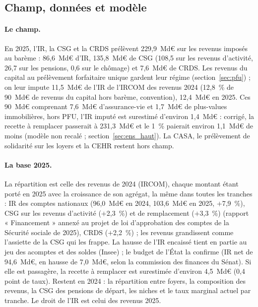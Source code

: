 
\subsection{Champ, données et modèle}

\paragraph{Le champ.} En 2025, l'IR, la CSG et la CRDS prélèvent 229,9~Md€ sur les revenus imposés au barème : 86,6~Md€
d'IR, 135,8~Md€ de CSG (108,5 sur les revenus d'activité, 26,7 sur les pensions, 0,6 sur le chômage) et 7,6~Md€ de CRDS.
Les revenus du capital au prélèvement forfaitaire unique gardent leur régime (section~\ref{sec:pfu}) ; on leur impute
11,5~Md€ de l'IR de l'IRCOM des revenus 2024 (12,8~\% de 90~Md€ de revenus du capital hors barème, convention), 12,4~Md€
en 2025. Ces 90~Md€ comprenant 7,6~Md€ d'assurance-vie et 1,7~Md€ de plus-values immobilières, hors PFU, l'IR imputé est
surestimé d'environ 1,4~Md€ : corrigé, la recette à remplacer passerait à 231,3~Md€ et le 1~\% paierait environ 1,1~Md€
de moins (modèle non recalé ; section~\ref{sec:ens_haut}). La CASA, le prélèvement de solidarité sur les loyers et la
CEHR restent hors champ.

\paragraph{La base 2025.} La répartition est celle des revenus de 2024 (IRCOM), chaque montant étant porté en 2025 avec
la croissance de son agrégat, la même dans toutes les tranches : IR des comptes nationaux (96,0~Md€ en 2024, 103,6~Md€
en 2025, $+$7,9~\%), CSG sur les revenus d'activité ($+$2,3~\%) et de remplacement ($+$3,3~\%) (rapport « Financement »
annexé au projet de loi d'approbation des comptes de la Sécurité sociale de 2025), CRDS ($+$2,2~\%) ; les revenus
grandissent comme l'assiette de la CSG qui les frappe. La hausse de l'IR encaissé tient en partie au jeu des acomptes et
des soldes (Insee) ; le budget de l'État la confirme (IR net de 94,6~Md€, en hausse de 7,0~Md€, selon la commission des
finances du Sénat). Si elle est passagère, la recette à remplacer est surestimée d'environ 4,5~Md€ (0,4 point de taux).
Restent en 2024 : la répartition entre foyers, la composition des revenus, la CSG des pensions de départ, les niches et
le taux marginal actuel par tranche. Le droit de l'IR est celui des revenus 2025.

